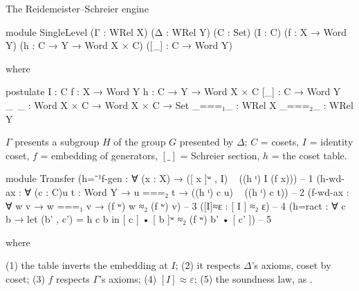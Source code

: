 \begin{frame}{The Reidemeister--Schreier engine \InPaper}
\begin{code}
module SingleLevel (Γ : WRel X) (Δ : WRel Y) (C : Set) (I : C)
  (f : X → Word Y) (h : C → Y → Word X × C) ([_] : C → Word Y)
\end{code}
\begin{code}[hide]
  where

postulate
  I      : C
  f      : X → Word Y
  h      : C → Y → Word X × C
  [_]    : C → Word Y
  _~_    : Word X × C → Word X × C → Set
  _===₁_ : WRel X
  _===₂_ : WRel Y
\end{code}
\vspace{-2pt}
{\small $\Gamma$ presents a subgroup $H$ of the group $G$ presented by $\Delta$;
$C$ = cosets, $I$ = identity coset, $f$ = embedding of generators,
$[\_]$ = Schreier section, $h$ = the coset table.}
\begin{code}
module Transfer
  (h=⁻¹f-gen : ∀ (x : X) → ([ x ]ʷ , I) ~ ((h ᵗ) I (f x)))                         -- 1
  (h-wd-ax : ∀ (c : C){u t : Word Y} → u ===₂ t → ((h ᵗ) c u) ~ ((h ᵗ) c t))       -- 2
  (f-wd-ax : ∀ {w v} → w ===₁ v → (f ʷ) w ≈₂ (f ʷ) v)                              -- 3
  ([I]≈ε : [ I ] ≈₂ ε)                                                             -- 4
  (h=ract : ∀ c b → let (b' , c') = h c b in [ c ] • [ b ]ʷ ≈₂ (f ʷ) b' • [ c' ])  -- 5
\end{code}
\begin{code}[hide]
  where
\end{code}
\vspace{-4pt}
{\small (1) the table inverts the embedding at $I$;\; (2) it respects $\Delta$'s
axioms, coset by coset;\; (3) $f$ respects $\Gamma$'s axioms;\; (4) $[I]\approx\varepsilon$;\;
(5) the soundness law, as .}
\end{frame}

